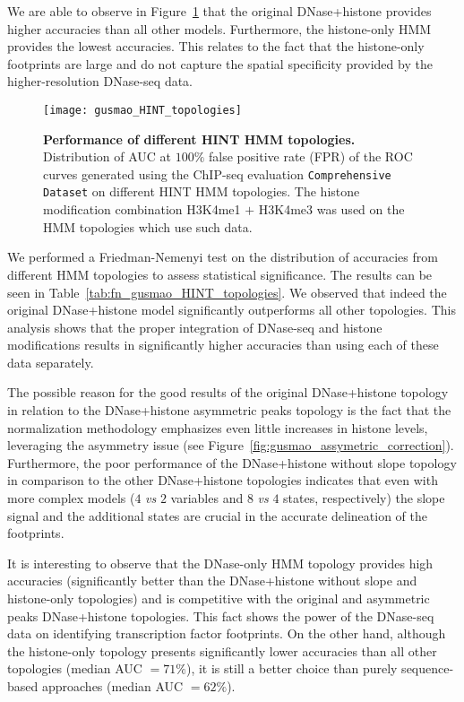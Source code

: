 We are able to observe in Figure~\ref{fig:gusmao_HINT_topologies} that the original DNase+histone provides higher accuracies than all other models. Furthermore, the histone-only HMM provides the lowest accuracies. This relates to the fact that the histone-only footprints are large and do not capture the spatial specificity provided by the higher-resolution DNase-seq data.

\begin{figure}[h!]
\centering
\texttt{[image: gusmao\_HINT\_topologies]}
\caption[Performance of different HINT HMM topologies]{\textbf{Performance of different HINT HMM topologies.} Distribution of AUC at $100\%$ false positive rate (FPR) of the ROC curves generated using the ChIP-seq evaluation {\tt Comprehensive Dataset} on different HINT HMM topologies. The histone modification combination H3K4me1 $+$ H3K4me3 was used on the HMM topologies which use such data.}
\label{fig:gusmao_HINT_topologies}
\end{figure}

We performed a Friedman-Nemenyi test on the distribution of accuracies from different HMM topologies to assess statistical significance. The results can be seen in Table~\ref{tab:fn_gusmao_HINT_topologies}. We observed that indeed the original DNase+histone model significantly outperforms all other topologies. This analysis shows that the proper integration of DNase-seq and histone modifications results in significantly higher accuracies than using each of these data separately.

The possible reason for the good results of the original DNase+histone topology in relation to the DNase+histone asymmetric peaks topology is the fact that the normalization methodology emphasizes even little increases in histone levels, leveraging the asymmetry issue (see Figure~\ref{fig:gusmao_assymetric_correction}). Furthermore, the poor performance of the DNase+histone without slope topology in comparison to the other DNase+histone topologies indicates that even with more complex models ($4$ \emph{vs} $2$ variables and $8$ \emph{vs} $4$ states, respectively) the slope signal and the additional states are crucial in the accurate delineation of the footprints.

It is interesting to observe that the DNase-only HMM topology provides high accuracies (significantly better than the DNase+histone without slope and histone-only topologies) and is competitive with the original and asymmetric peaks DNase+histone topologies. This fact shows the power of the DNase-seq data on identifying transcription factor footprints. On the other hand, although the histone-only topology presents significantly lower accuracies than all other topologies (median AUC $= 71\%$), it is still a better choice than purely sequence-based approaches (median AUC $= 62\%$).

